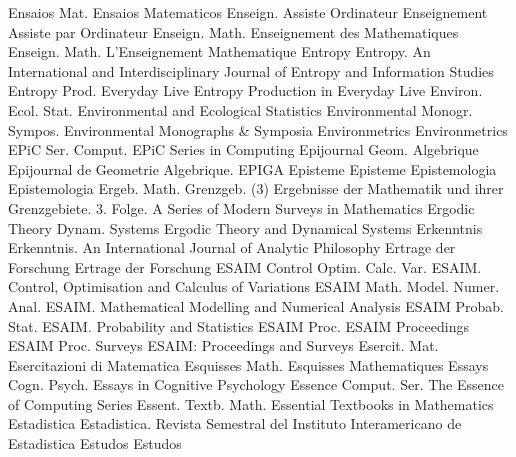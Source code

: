 {Ensaios Mat.}
{Ensaios Matematicos}
{Enseign. Assiste Ordinateur}
{Enseignement Assiste par Ordinateur}
{Enseign. Math.}
{Enseignement des Mathematiques}
{Enseign. Math.}
{L'Enseignement Mathematique}
{Entropy}
{Entropy. An International and Interdisciplinary Journal of Entropy and Information Studies}
{Entropy Prod. Everyday Live}
{Entropy Production in Everyday Live}
{Environ. Ecol. Stat.}
{Environmental and Ecological Statistics}
{Environmental Monogr. Sympos.}
{Environmental Monographs & Symposia}
{Environmetrics}
{Environmetrics}
{EPiC Ser. Comput.}
{EPiC Series in Computing}
{Epijournal Geom. Algebrique}
{Epijournal de Geometrie Algebrique. EPIGA}
{Episteme}
{Episteme}
{Epistemologia}
{Epistemologia}
{Ergeb. Math. Grenzgeb. (3)}
{Ergebnisse der Mathematik und ihrer Grenzgebiete. 3. Folge. A Series of Modern Surveys in Mathematics}
{Ergodic Theory Dynam. Systems}
{Ergodic Theory and Dynamical Systems}
{Erkenntnis}
{Erkenntnis. An International Journal of Analytic Philosophy}
{Ertrage der Forschung}
{Ertrage der Forschung}
{ESAIM Control Optim. Calc. Var.}
{ESAIM. Control, Optimisation and Calculus of Variations}
{ESAIM Math. Model. Numer. Anal.}
{ESAIM. Mathematical Modelling and Numerical Analysis}
{ESAIM Probab. Stat.}
{ESAIM. Probability and Statistics}
{ESAIM Proc.}
{ESAIM Proceedings}
{ESAIM Proc. Surveys}
{ESAIM: Proceedings and Surveys}
{Esercit. Mat.}
{Esercitazioni di Matematica}
{Esquisses Math.}
{Esquisses Mathematiques}
{Essays Cogn. Psych.}
{Essays in Cognitive Psychology}
{Essence Comput. Ser.}
{The Essence of Computing Series}
{Essent. Textb. Math.}
{Essential Textbooks in Mathematics}
{Estadistica}
{Estadistica. Revista Semestral del Instituto Interamericano de Estadistica}
{Estudos}
{Estudos}
